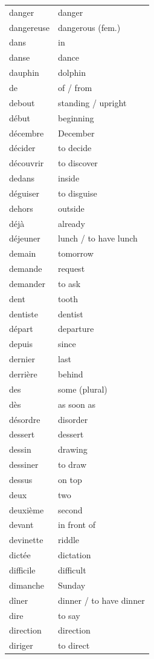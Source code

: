 \documentclass[12pt,a4paper]{article}
\begin{document}
\begin{longtable}{p{4cm} p{6cm}}
danger & danger \\
dangereuse & dangerous (fem.) \\
dans & in \\
danse & dance \\
dauphin & dolphin \\
de & of / from \\
debout & standing / upright \\
début & beginning \\
décembre & December \\
décider & to decide \\
découvrir & to discover \\
dedans & inside \\
déguiser & to disguise \\
dehors & outside \\
déjà & already \\
déjeuner & lunch / to have lunch \\
demain & tomorrow \\
demande & request \\
demander & to ask \\
dent & tooth \\
dentiste & dentist \\
départ & departure \\
depuis & since \\
dernier & last \\
derrière & behind \\
des & some (plural) \\
dès & as soon as \\
désordre & disorder \\
dessert & dessert \\
dessin & drawing \\
dessiner & to draw \\
dessus & on top \\
deux & two \\
deuxième & second \\
devant & in front of \\
devinette & riddle \\
dictée & dictation \\
difficile & difficult \\
dimanche & Sunday \\
dîner & dinner / to have dinner \\
dire & to say \\
direction & direction \\
diriger & to direct \\

\end{longtable}
\end{document}
